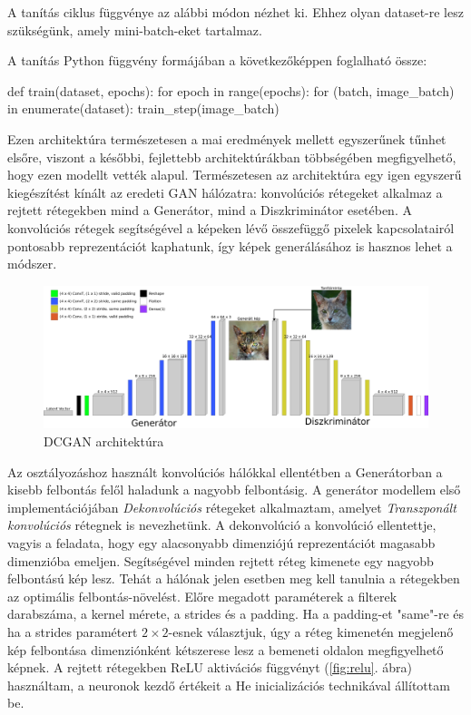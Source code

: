 A tanítás ciklus függvénye az alábbi módon nézhet ki. Ehhez olyan dataset-re lesz szükségünk, amely mini-batch-eket tartalmaz.

A tanítás Python függvény formájában a következőképpen foglalható össze:
\begin{python}
def train(dataset, epochs):
    for epoch in range(epochs):
        for (batch, image_batch) in enumerate(dataset):
            train_step(image_batch)
\end{python}


Ezen architektúra természetesen a mai eredmények mellett egyszerűnek tűnhet elsőre, viszont a későbbi, fejlettebb architektúrákban többségében megfigyelhető, hogy ezen modellt vették alapul. Természetesen az architektúra egy igen egyszerű kiegészítést kínált az eredeti GAN hálózatra: konvolúciós rétegeket alkalmaz a rejtett rétegekben mind a Generátor, mind a Diszkriminátor esetében. A konvolúciós rétegek segítségével a képeken lévő összefüggő pixelek kapcsolatairól pontosabb reprezentációt kaphatunk, így képek generálásához is hasznos lehet a módszer.

\begin{figure}[h]
\centering
\includegraphics[width=15cm]{images/DCGAN.png}
\caption{DCGAN architektúra}
\label{fig:dcgan}
\end{figure}


Az osztályozáshoz használt konvolúciós hálókkal ellentétben a Generátorban a kisebb felbontás felől haladunk a nagyobb felbontásig.
A generátor modellem első implementációjában \textit{Dekonvolúciós} rétegeket alkalmaztam, amelyet \textit{Transzponált konvolúciós} rétegnek is nevezhetünk. A dekonvolúció a konvolúció ellentettje, vagyis a feladata, hogy egy alacsonyabb dimenziójú reprezentációt magasabb dimenzióba emeljen. Segítségével minden rejtett réteg kimenete egy nagyobb felbontású kép lesz. Tehát a hálónak jelen esetben meg kell tanulnia a rétegekben az optimális felbontás-növelést. Előre megadott paraméterek a filterek darabszáma, a kernel mérete, a strides és a padding. Ha a padding-et "same"-re és ha a strides paramétert $2 \times 2$-esnek választjuk, úgy a réteg kimenetén megjelenő kép felbontása dimenziónként kétszerese lesz a bemeneti oldalon megfigyelhető képnek. A rejtett rétegekben ReLU aktivációs függvényt (\ref{fig:relu}. ábra) használtam, a neuronok kezdő értékeit a He inicializációs technikával \cite{he2015delving} állítottam be.

